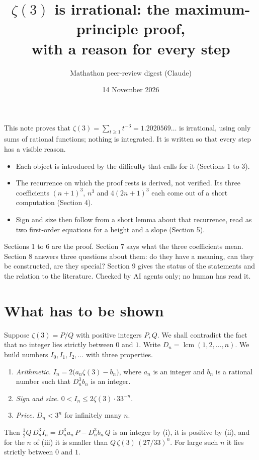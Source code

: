 \documentclass[11pt]{article}
\title{$\zeta(3)$ is irrational: the maximum-principle proof,\\ with a reason for every step}
\author{Mathathon peer-review digest (Claude)}
\date{14 November 2026}
\DeclareMathOperator{\lcm}{lcm}
\begin{document}
\maketitle

\noindent This note proves that $\zeta(3)=\sum_{t\ge1}t^{-3}=1.2020569\ldots$ is irrational, using only
sums of rational functions; nothing is integrated. It is written so that every step has a visible
reason.
\begin{itemize}
\item Each object is introduced by the difficulty that calls for it (Sections 1 to 3).
\item The recurrence on which the proof rests is derived, not verified. Its three coefficients
$(n+1)^3$, $n^3$ and $4(2n+1)^3$ each come out of a short computation (Section 4).
\item Sign and size then follow from a short lemma about that recurrence, read as two first-order
equations for a height and a slope (Section 5).
\end{itemize}
Sections 1 to 6 are the proof. Section 7 says what the three coefficients mean.
Section 8 answers three questions about them: do they have a meaning, can they be constructed, are
they special? Section 9 gives the status of the statements and the relation to the literature.
Checked by AI agents only; no human has read it.

\section{What has to be shown}

Suppose $\zeta(3)=P/Q$ with positive integers $P,Q$. We shall contradict the fact that no integer
lies strictly between $0$ and $1$. Write $D_n=\lcm(1,2,\dots,n)$. We build numbers
$I_0,I_1,I_2,\dots$ with three properties.
\begin{enumerate}[label=(\roman*)]
\item \emph{Arithmetic.} $I_n=2\bigl(a_n\zeta(3)-b_n\bigr)$, where $a_n$ is an integer and $b_n$ is a
rational number such that $D_n^3b_n$ is an integer.
\item \emph{Sign and size.} $0<I_n\le2\zeta(3)\cdot33^{-n}$.
\item \emph{Price.} $D_n<3^n$ for infinitely many $n$.
\end{enumerate}
Then $\frac12Q\,D_n^3I_n=D_n^3a_n\,P-D_n^3b_n\,Q$ is an integer by (i), it is positive by (ii), and
for the $n$ of (iii) it is smaller than $Q\,\zeta(3)\,(27/33)^n$. For large such $n$ it lies strictly
between $0$ and $1$.
\end{document}
